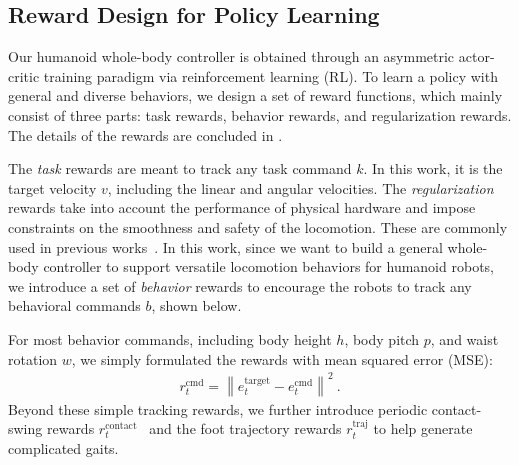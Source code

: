 \subsection{Reward Design for Policy Learning}
Our humanoid whole-body controller is obtained through an asymmetric actor-critic training paradigm via reinforcement learning (RL). To learn a policy with general and diverse behaviors, we design a set of reward functions, which mainly consist of three parts: task rewards, behavior rewards, and regularization rewards. The details of the rewards are concluded in .



The \textit{task} rewards are meant to track any task command $k$. In this work, it is the target velocity $v$, including the linear and angular velocities. 
The \textit{regularization} rewards take into account the performance of physical hardware and impose constraints on the smoothness and safety of the locomotion.
These are commonly used in previous works~\cite{rudin2022learning}.
In this work, since we want to build a general whole-body controller to support versatile locomotion behaviors for humanoid robots, we introduce a set of \textit{behavior} rewards to encourage the robots to track any behavioral commands $b$, shown below.

For most behavior commands, including body height $h$, body pitch $p$, and waist rotation $w$, we simply formulated the rewards with mean squared error (MSE):
\begin{equation}
\begin{aligned}
r_t^{\text{cmd}} = \left \| e_t^{\text{target}} - e_t^{\text{cmd}} \right \|^2~.
\end{aligned}
\end{equation}
Beyond these simple tracking rewards, we further introduce periodic contact-swing rewards $r_t^{\text{contact}}$~\citep{2021BipedalPeriodicReward, margolis2022walktheseways} and the foot trajectory rewards $r_t^{\text{traj}}$ to help generate complicated gaits.

